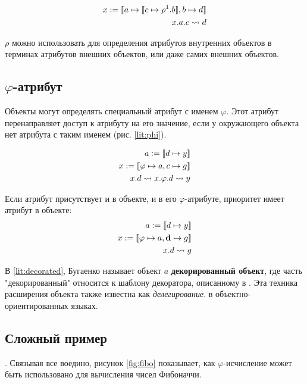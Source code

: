 \begin{align}
    \label{lit:complex}
    x := \llbracket a \mapsto \llbracket c \mapsto \rho^1.b \rrbracket, b \mapsto d \rrbracket \\
    x.a.c \rightsquigarrow d
\end{align}

$\rho$ можно использовать для определения атрибутов внутренних объектов в терминах атрибутов внешних объектов, или даже самих внешних объектов.

\subsection{$\varphi$-атрибут}
Объекты могут определять специальный атрибут с именем $\varphi$. Этот атрибут перенаправляет доступ к атрибуту на его значение, если у окружающего объекта нет атрибута с таким именем (рис. \ref{lit:phi}).

\begin{align}
    \label{lit:phi}
    a := \llbracket d \mapsto y \rrbracket                    \\
    \label{lit:decorated}
    x := \llbracket \varphi \mapsto a, c \mapsto g \rrbracket \\
    x.d \rightsquigarrow x.\varphi.d \rightsquigarrow y
\end{align}

Если атрибут присутствует и в объекте, и в его $\varphi$-атрибуте, приоритет имеет атрибут в объекте:
\begin{align*}
    a := \llbracket d \mapsto y \rrbracket                             \\
    x := \llbracket \varphi \mapsto a, \textbf{d} \mapsto g \rrbracket \\
    x.d \rightsquigarrow g
\end{align*}

В \ref{lit:decorated}, Бугаенко \cite{eolang} называет объект $a$ \textbf{декорированный объект}, где часть "декорированный" относится к шаблону декоратора, описанному в \cite[Глава 4]{GOFPatterns}. Эта техника расширения объекта также известна как \textit{делегирование}. \cite{raiha_delegation:_1994} в объектно-ориентированных языках.

\subsection{Сложный пример}.
Связывая все воедино, рисунок \ref{fig:fibo} показывает, как $\varphi$-исчисление может быть использовано для вычисления чисел Фибоначчи.


